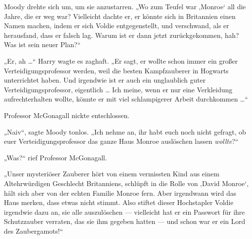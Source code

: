 Moody drehte sich um, um sie anzustarren.
„Wo zum Teufel war ‚Monroe‘ all die Jahre, die er weg war? Vielleicht dachte er, er könnte sich in Britannien einen Namen machen, indem er sich Voldie entgegenstellt, und verschwand, als er herausfand, dass er falsch lag. Warum ist er dann jetzt zurückgekommen, hah? Was ist sein neuer Plan?“

„Er, ah …“ Harry wagte es zaghaft.
„Er sagt, er wollte schon immer ein großer Verteidigungsprofessor werden, weil die besten Kampfzauberer in Hogwarts unterrichtet haben. Und irgendwie ist er auch ein unglaublich guter Verteidigungsprofessor, eigentlich … Ich meine, wenn er nur eine Verkleidung aufrechterhalten wollte, könnte er mit viel schlampigerer Arbeit durchkommen …“

Professor McGonagall nickte entschlossen.

„Naiv“, sagte Moody tonlos.
„Ich nehme an, ihr habt euch noch nicht gefragt, ob euer Verteidigungsprofessor das ganze Haus Monroe auslöschen lassen \emph{wollte}?“

„Was?“ rief Professor McGonagall.

„Unser mysteriöser Zauberer hört von einem vermissten Kind aus einem Altehrwürdigen Geschlecht Britanniens, schlüpft in die Rolle von ‚David Monroe‘, hält sich aber von der echten Familie Monroe fern. Aber irgendwann wird das Haus merken, dass etwas nicht stimmt. Also stiftet dieser Hochstapler Voldie irgendwie dazu an, sie alle auszulöschen — vielleicht hat er ein Passwort für ihre Schutzzauber verraten, das sie ihm gegeben hatten — und schon war er ein Lord des Zaubergamots!“

